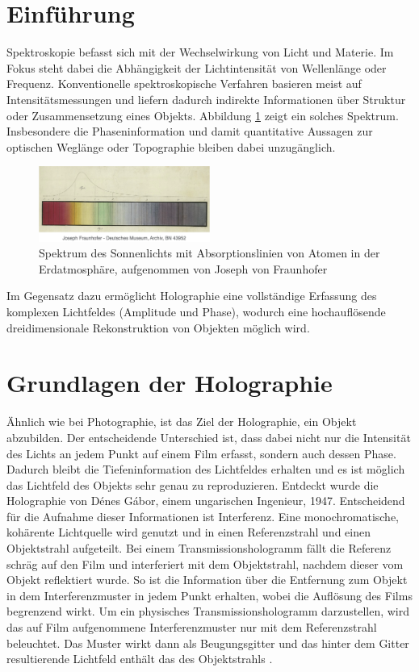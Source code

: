 \documentclass[10pt,twocolumn,a4paper]{article}
\begin{document}
\section{Einführung}
\small
Spektroskopie befasst sich mit der Wechselwirkung von Licht und Materie. Im Fokus steht dabei die Abhängigkeit der Lichtintensität von Wellenlänge oder Frequenz. Konventionelle spektroskopische Verfahren basieren meist auf Intensitätsmessungen und liefern dadurch indirekte Informationen über Struktur oder Zusammensetzung eines Objekts. Abbildung \ref{fig:spectrum} zeigt ein solches Spektrum. Insbesondere die Phaseninformation und damit quantitative Aussagen zur optischen Weglänge oder Topographie bleiben dabei unzugänglich.

\begin{figure}
    \centering
    \includegraphics[width=0.5\textwidth]{images/frauenhofer.png}
    \caption{Spektrum des Sonnenlichts mit Absorptionslinien von Atomen in der Erdatmosphäre, aufgenommen von Joseph von Fraunhofer}
    \label{fig:spectrum}
\end{figure}

Im Gegensatz dazu ermöglicht Holographie eine vollständige Erfassung des komplexen Lichtfeldes (Amplitude und Phase), wodurch eine hochauflösende dreidimensionale Rekonstruktion von Objekten möglich wird.

\section{Grundlagen der Holographie}
Ähnlich wie bei Photographie, ist das Ziel der Holographie, ein Objekt abzubilden. Der entscheidende Unterschied ist, dass dabei nicht nur die Intensität des Lichts an jedem Punkt auf einem Film erfasst, sondern auch dessen Phase. Dadurch bleibt die Tiefeninformation des Lichtfeldes erhalten und es ist möglich das Lichtfeld des Objekts sehr genau zu reproduzieren. Entdeckt wurde die Holographie von Dénes Gábor, einem ungarischen Ingenieur, 1947. Entscheidend für die Aufnahme dieser Informationen ist Interferenz. Eine monochromatische, kohärente Lichtquelle wird genutzt und in einen Referenzstrahl und einen Objektstrahl aufgeteilt. Bei einem Transmissionshologramm fällt die Referenz schräg auf den Film und interferiert mit dem Objektstrahl, nachdem dieser vom Objekt reflektiert wurde. So ist die Information über die Entfernung zum Objekt in dem Interferenzmuster in jedem Punkt erhalten, wobei die Auflösung des Films begrenzend wirkt. Um ein physisches Transmissionshologramm darzustellen, wird das auf Film aufgenommene Interferenzmuster nur mit dem Referenzstrahl beleuchtet. Das Muster wirkt dann als Beugungsgitter und das hinter dem Gitter resultierende Lichtfeld enthält das des Objektstrahls \cite{Gabor}.
\end{document}
